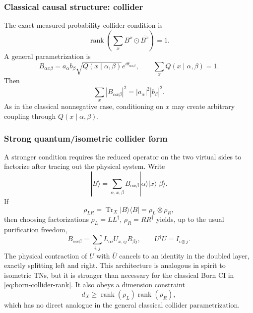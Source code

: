 \documentclass[11pt]{article}
\theoremstyle{remark}
\newcommand{\rank}{\operatorname{rank}}
\newcommand{\Tr}{\operatorname{Tr}}
\newcommand{\odotc}{\mathbin{\odot}}
\begin{document}
\subsubsection{Classical causal structure: collider}

The exact measured-probability collider condition is
\begin{equation}
\rank\!\left(\sum_x B^x\odotc\overline{B^x}\right)=1.
\label{eq:born-collider-rank}
\end{equation}
A general parametrization is
\begin{equation}
B_{\alpha x\beta}=a_\alpha b_\beta\sqrt{Q(x\mid\alpha,\beta)}e^{i\theta_{\alpha x\beta}},
\qquad \sum_xQ(x\mid\alpha,\beta)=1.
\label{eq:born-collider-form}
\end{equation}
Then
\begin{equation}
\sum_x|B_{\alpha x\beta}|^2=|a_\alpha|^2|b_\beta|^2.
\end{equation}
As in the classical nonnegative case, conditioning on $x$ may create arbitrary coupling through $Q(x\mid\alpha,\beta)$.

\subsubsection{Strong quantum/isometric collider form}

A stronger condition requires the reduced operator on the two virtual sides to factorize after tracing out the physical system. Write
\begin{equation}
|B\rangle=\sum_{\alpha,x,\beta}B_{\alpha x\beta}|\alpha\rangle|x\rangle|\beta\rangle.
\end{equation}
If
\begin{equation}
\rho_{LR}=\Tr_X|B\rangle\langle B|=\rho_L\otimes\rho_R,
\label{eq:strong-collider}
\end{equation}
then choosing factorizations $\rho_L=LL^\dagger$, $\rho_R=RR^\dagger$ yields, up to the usual purification freedom,
\begin{equation}
B_{\alpha x\beta}=\sum_{i,j}L_{\alpha i}U_{x,ij}R_{\beta j},
\qquad
U^\dagger U=I_{i\otimes j}.
\label{eq:isometric-collider}
\end{equation}
The physical contraction of $U$ with $\overline U$ cancels to an identity in the doubled layer, exactly splitting left and right. This architecture is analogous in spirit to isometric TNs, but it is stronger than necessary for the classical Born CI in \cref{eq:born-collider-rank}. It also obeys a dimension constraint
\begin{equation}
d_X\ge \rank(\rho_L)\rank(\rho_R),
\end{equation}
which has no direct analogue in the general classical collider parametrization.
\end{document}
